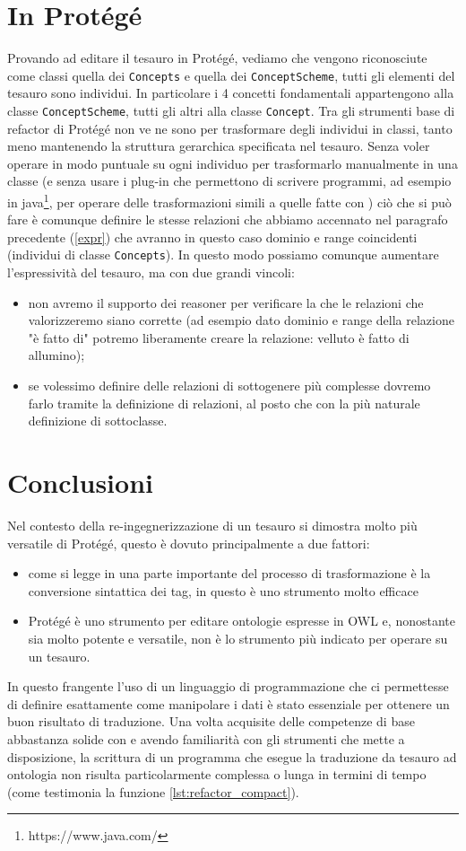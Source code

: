 \section{In Protégé}
Provando ad editare il tesauro in Protégé, vediamo che vengono riconosciute come classi quella dei \verb|Concepts| e quella dei \verb|ConceptScheme|, tutti gli elementi del tesauro sono individui. In particolare i 4 concetti fondamentali appartengono alla classe \verb|ConceptScheme|, tutti gli altri alla classe \verb|Concept|. Tra gli strumenti base di refactor di Protégé non ve ne sono per trasformare degli individui in classi, tanto meno mantenendo la struttura gerarchica specificata nel tesauro. Senza voler operare in modo puntuale su ogni individuo per trasformarlo manualmente in una classe (e senza usare i plug-in che permettono di scrivere programmi, ad esempio in java\footnote{https://www.java.com/}, per operare delle trasformazioni simili a quelle fatte con \cduce) ciò che si può fare è comunque definire le stesse relazioni che abbiamo accennato nel paragrafo precedente (\ref{expr}) che avranno in questo caso dominio e range coincidenti (individui di classe \verb|Concepts|). In questo modo possiamo comunque aumentare l'espressività del tesauro, ma con due grandi vincoli:
\begin{itemize}
	\item non avremo il supporto dei reasoner per verificare la che le relazioni che valorizzeremo siano corrette (ad esempio dato dominio e range della relazione "è fatto di" potremo liberamente creare la relazione: velluto è fatto di allumino);
	\item se volessimo definire delle relazioni di sottogenere più complesse dovremo farlo tramite la definizione di relazioni, al posto che con la più naturale definizione di sottoclasse.
\end{itemize}
\section{Conclusioni}
Nel contesto della re-ingegnerizzazione di un tesauro \cduce si dimostra molto più versatile di Protégé, questo è dovuto principalmente a due fattori:
\begin{itemize}
	\item come si legge in \cite{re_engineeringThesaurus} una parte importante del processo di trasformazione è la conversione sintattica dei tag, in questo \cduce è uno strumento molto efficace
	\item Protégé è uno strumento per editare ontologie espresse in OWL \cite{protege_doc} e, nonostante sia molto potente e versatile, non è lo strumento più indicato per operare su un tesauro.
\end{itemize}
In questo frangente l'uso di un linguaggio di programmazione che ci permettesse di definire esattamente come manipolare i dati è stato essenziale per ottenere un buon risultato di traduzione. Una volta acquisite delle competenze di base abbastanza solide con \cduce e avendo familiarità con gli strumenti che mette a disposizione, la scrittura di un programma che esegue la traduzione da tesauro ad ontologia non risulta particolarmente complessa o lunga in termini di tempo (come testimonia la funzione \ref{lst:refactor_compact}).

